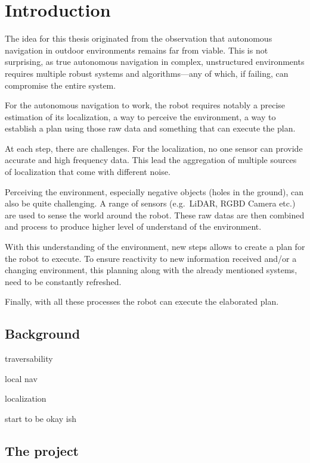 \chapter{Introduction}\label{ch:introduction}

The idea for this thesis originated from the observation that autonomous navigation in outdoor environments
remains far from viable.
This is not surprising, as true autonomous navigation in complex, unstructured environments
requires multiple robust systems and algorithms—any of which, if failing, can compromise the entire system.

For the autonomous navigation to work, the robot requires notably a precise estimation of its localization,
a way to perceive the environment, a way to establish a plan using those raw data and something that can
execute the plan.

At each step, there are challenges.
For the localization, no one sensor can provide accurate and high frequency data.
This lead the aggregation of multiple sources of localization that come with different noise.

Perceiving the environment, especially negative objects (holes in the ground), can also be quite challenging.
A range of sensors (e.g.\ LiDAR, RGBD Camera etc.) are used to sense the world around the robot.
These raw datas are then combined and process to produce higher level of understand of the environment.

With this understanding of the environment, new steps allows to create a plan for the robot to execute.
To ensure reactivity to new information received and/or a changing environment, this planning along with the
already mentioned systems, need to be constantly refreshed.

Finally, with all these processes the robot can execute the elaborated plan.


\section{Background}\label{sec:background}

traversability

local nav

localization

start to be okay ish


\section{The project}\label{sec:the-project}

